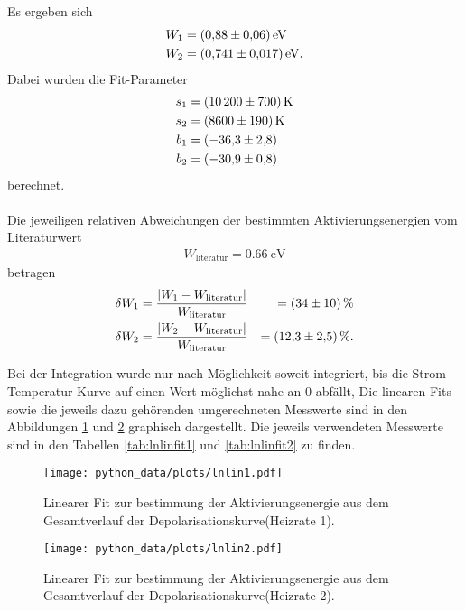 Es ergeben sich
\begin{align*}
  W_{1} &= \SI{0.88+-0.06}{\electronvolt} \\
  W_{2} &= \SI{0.741+-0.017}{\electronvolt}.
\end{align*}
Dabei wurden die Fit-Parameter\\
\begin{align*}
  s_{1} &= \SI{10200+-700}{\kelvin}  \\
  s_{2} &= \SI{8600+-190}{\kelvin}  \\
  b_{1} &= \SI{-36.3+-2.8}{}  \\
  b_{2} &= \SI{-30.9+-0.8}{}
\end{align*}
berechnet.\\ \\
Die jeweiligen relativen Abweichungen der bestimmten Aktivierungsenergien vom Literaturwert \cite{literaturwert}
\begin{align*}
  W_\text{literatur} = \SI{0.66}{\electronvolt}
\end{align*}
betragen
\begin{align*}
  \delta W_{1} &= \frac{\lvert W_{1} - W_\text{literatur} \rvert}{W_\text{literatur}} &= \SI{34+-10}{\percent}\\
  \delta W_{2} &= \frac{\lvert W_{2} - W_\text{literatur} \rvert}{W_\text{literatur}} &= \SI{12.3+-2.5}{\percent} .
\end{align*}


Bei der Integration wurde nur nach Möglichkeit soweit integriert, bis die Strom-Temperatur-Kurve auf einen Wert möglichst nahe an $0$ abfällt,
Die linearen Fits sowie die jeweils dazu gehörenden umgerechneten Messwerte sind in den Abbildungen \ref{fig:lin1l} und \ref{fig:lin2l} graphisch dargestellt.
Die jeweils verwendeten Messwerte sind in den Tabellen \ref{tab:lnlinfit1} und \ref{tab:lnlinfit2} zu finden.\\

\begin{figure}
  \centering
  \texttt{[image: python\_data/plots/lnlin1.pdf]}
  \caption{Linearer Fit zur bestimmung der Aktivierungsenergie aus dem Gesamtverlauf der Depolarisationskurve(Heizrate 1).}
  \label{fig:lin1l}
\end{figure}

\begin{figure}
  \centering
  \texttt{[image: python\_data/plots/lnlin2.pdf]}
  \caption{Linearer Fit zur bestimmung der Aktivierungsenergie aus dem Gesamtverlauf der Depolarisationskurve(Heizrate 2).}
  \label{fig:lin2l}
\end{figure}

